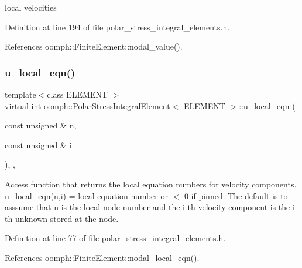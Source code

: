 local velocities 



Definition at line 194 of file polar\+\_\+stress\+\_\+integral\+\_\+elements.\+h.



References oomph\+::\+Finite\+Element\+::nodal\+\_\+value().

\mbox{\label{classoomph_1_1PolarStressIntegralElement_adbf12bebeb0ffb79b5ab4157fa89a6a9}} 
\subsubsection{\texorpdfstring{u\+\_\+local\+\_\+eqn()}{u\_local\_eqn()}}
{\footnotesize\ttfamily template$<$class E\+L\+E\+M\+E\+NT $>$ \\
virtual int \hyperlink{classoomph_1_1PolarStressIntegralElement}{oomph\+::\+Polar\+Stress\+Integral\+Element}$<$ E\+L\+E\+M\+E\+NT $>$\+::u\+\_\+local\+\_\+eqn (\begin{DoxyParamCaption}\item[{const unsigned \&}]{n,  }\item[{const unsigned \&}]{i }\end{DoxyParamCaption})\hspace{0.3cm}{\ttfamily [inline]}, {\ttfamily [protected]}, {\ttfamily [virtual]}}



Access function that returns the local equation numbers for velocity components. u\+\_\+local\+\_\+eqn(n,i) = local equation number or $<$ 0 if pinned. The default is to asssume that n is the local node number and the i-\/th velocity component is the i-\/th unknown stored at the node. 



Definition at line 77 of file polar\+\_\+stress\+\_\+integral\+\_\+elements.\+h.



References oomph\+::\+Finite\+Element\+::nodal\+\_\+local\+\_\+eqn().

\mbox{\label{classoomph_1_1PolarStressIntegralElement_accc1886b4e4d60b19046e11484e5d09d}} 
